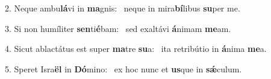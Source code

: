 2. Neque ambu\textbf{lá}vi in \textbf{ma}gnis: \ast\  neque in mira\textbf{bí}libus \textbf{su}per me.\

3. Si non humíliter \textbf{sen}ti\textbf{é}bam: \ast\  sed exaltávi \textbf{á}nimam \textbf{me}am.\

4. Sicut ablactátus est super \textbf{ma}tre \textbf{su}a: \ast\  ita retribútio in \textbf{á}nima \textbf{me}a.\

5. Speret Isra\textbf{ël} in \textbf{Dó}mino: \ast\  ex hoc nunc et \textbf{us}que in \textbf{sǽ}culum.\

